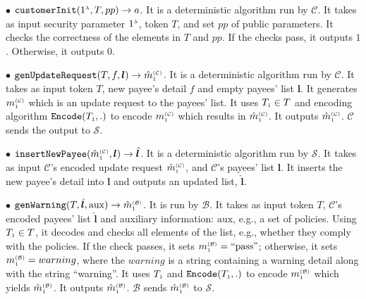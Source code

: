 \begin{definition}
\item[$\bullet$] $\mathtt{customerInit} (1^{\scriptscriptstyle \lambda}, T, pp)\rightarrow a$. It is a deterministic  algorithm run by  $\mathcal{C}$. It takes as input security parameter $1^{\scriptscriptstyle \lambda}$,  token $T$, and  set $pp$ of public parameters. It checks the correctness of the elements in $T$ and $pp$. If the checks pass, it outputs $1$. Otherwise, it outputs $0$. 


\item [$\bullet$] $\mathtt{genUpdateRequest}(T, f, {\bm l})\rightarrow \hat m^{\scriptscriptstyle\mathcal{(C)}}_{\scriptscriptstyle 1}$.  It is a deterministic algorithm run by $\mathcal{C}$.  It takes as input token $T$,  new payee's detail $f$ and empty payees' list $ {\bm l}$. It  generates $m^{\scriptscriptstyle\mathcal{(C)}}_{\scriptscriptstyle 1}$ which is an  update request to the payees' list. It uses $T_{\scriptscriptstyle 1}\in T$ and encoding algorithm $\mathtt{Encode}(T_{\scriptscriptstyle 1}, .)$ to encode $m^{\scriptscriptstyle\mathcal{(C)}}_{\scriptscriptstyle 1}$ which results in $\hat {m}^{\scriptscriptstyle\mathcal{(C)}}_{\scriptscriptstyle 1}$. It outputs $\hat  m^{\scriptscriptstyle\mathcal{(C)}}_{\scriptscriptstyle 1}$. $\mathcal{C}$ sends the output to $\mathcal{S}$.
%

\item [$\bullet$] $\mathtt{insertNewPayee}(\hat{m}^{\scriptscriptstyle\mathcal{(C)}}_{\scriptscriptstyle 1}, {\bm l})\rightarrow  \hat{\bm l}$. It is a deterministic algorithm run by $\mathcal{S}$. It takes as input $\mathcal{C}$'s encoded update request  $\hat{m}^{\scriptscriptstyle\mathcal{(C)}}_{\scriptscriptstyle 1}$, and $\mathcal{C}$'s payees' list ${\bm l}$. It inserts the new payee's detail into ${\bm l}$ and outputs an updated list, $\hat{\bm l}$.
%

\item  [$\bullet$] $\mathtt{genWarning}(T, \hat{\bm l}, \text{aux})\rightarrow \hat m^{\scriptscriptstyle\mathcal{(B)}}_{\scriptscriptstyle1}$. It is run by $\mathcal{B}$. It takes as input token $T$, $\mathcal{C}$'s encoded   payees' list $ \hat{\bm l}$ and auxiliary information: $\text{aux}$, e.g., a set of policies. Using $T_{\scriptscriptstyle 1}\in T$, it decodes and checks  all elements of the list, e.g., whether they comply with the policies. If the check  passes,  it sets $m^{\scriptscriptstyle\mathcal{(B)}}_{\scriptscriptstyle1}=\text{``pass''}$; otherwise, it sets $m^{\scriptscriptstyle\mathcal{(B)}}_{\scriptscriptstyle1}={warning}$, where the $warning$ is a string  containing a warning detail along with
the string ``warning''. It uses  $T_{\scriptscriptstyle 1}$ and $\mathtt{Encode}(T_{\scriptscriptstyle 1}, .)$ to encode $m^{\scriptscriptstyle\mathcal{(B)}}_{\scriptscriptstyle1}$ which yields $\hat m^{\scriptscriptstyle\mathcal{(B)}}_{\scriptscriptstyle1}$. It outputs  $\hat m^{\scriptscriptstyle\mathcal{(B)}}_{\scriptscriptstyle1}$.  $\mathcal{B}$ sends $\hat m^{\scriptscriptstyle\mathcal{(B)}}_{\scriptscriptstyle1}$ to $\mathcal{S}$.
%


\end{definition}
